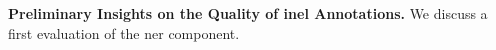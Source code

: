 

\textbf{Preliminary Insights on the Quality of \ac{inel} Annotations.}
We discuss a first evaluation of the \ac{ner} component. 

